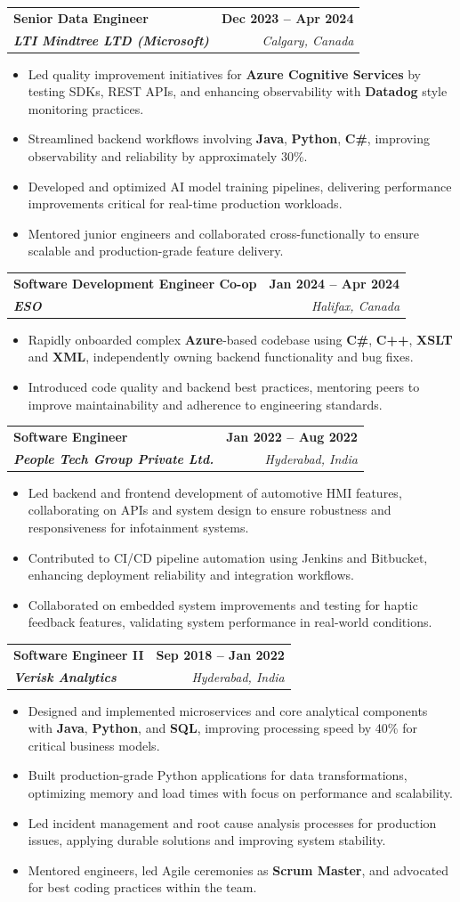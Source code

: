 \documentclass[letterpaper,11pt]{article}
\makeatletter
\newcommand{\resumeItem}[1]{
  \item\small{
    {#1 \vspace{-2pt}}
  }
}
\newcommand{\resumeSubheading}[4]{
  \vspace{-2pt}\item
    \begin{tabular*}{1.0\textwidth}[t]{l@{\extracolsep{\fill}}r}
      \textbf{#1} & \textbf{\small #2} \\
      \textit{\small#3} & \textit{\small #4} \\
    \end{tabular*}\vspace{-7pt}
}
\newcommand{\resumeItemListStart}{\begin{itemize}}
\newcommand{\resumeItemListEnd}{\end{itemize}\vspace{-5pt}}
\makeatother
\begin{document}
    \resumeSubheading
      {\textbf{Senior Data Engineer}}{\textbf{Dec 2023 -- Apr 2024}}
      {\textbf{LTI Mindtree LTD (Microsoft)}}{Calgary, Canada}
      \resumeItemListStart
        \resumeItem{Led quality improvement initiatives for \textbf{Azure Cognitive Services} by testing SDKs, REST APIs, and enhancing observability with \textbf{Datadog} style monitoring practices.}
        \resumeItem{Streamlined backend workflows involving \textbf{Java}, \textbf{Python}, \textbf{C\#}, improving observability and reliability by approximately 30\%.}
        \resumeItem{Developed and optimized AI model training pipelines, delivering performance improvements critical for real-time production workloads.}
        \resumeItem{Mentored junior engineers and collaborated cross-functionally to ensure scalable and production-grade feature delivery.}
      \resumeItemListEnd
    
    \resumeSubheading
      {\textbf{Software Development Engineer Co-op}}{\textbf{Jan 2024 -- Apr 2024}}
      {\textbf{ESO}}{Halifax, Canada}
      \resumeItemListStart
        \resumeItem{Rapidly onboarded complex \textbf{Azure}-based codebase using \textbf{C\#}, \textbf{C++}, \textbf{XSLT} and \textbf{XML}, independently owning backend functionality and bug fixes.}
        \resumeItem{Introduced code quality and backend best practices, mentoring peers to improve maintainability and adherence to engineering standards.}
      \resumeItemListEnd

    \resumeSubheading
      {\textbf{Software Engineer}}{\textbf{Jan 2022 -- Aug 2022}}
      {\textbf{People Tech Group Private Ltd.}}{Hyderabad, India}
      \resumeItemListStart
        \resumeItem{Led backend and frontend development of automotive HMI features, collaborating on APIs and system design to ensure robustness and responsiveness for infotainment systems.}
        \resumeItem{Contributed to CI/CD pipeline automation using Jenkins and Bitbucket, enhancing deployment reliability and integration workflows.}
        \resumeItem{Collaborated on embedded system improvements and testing for haptic feedback features, validating system performance in real-world conditions.}
      \resumeItemListEnd

    \resumeSubheading
      {\textbf{Software Engineer II}}{\textbf{Sep 2018 -- Jan 2022}}
      {\textbf{Verisk Analytics}}{Hyderabad, India}
      \resumeItemListStart
        \resumeItem{Designed and implemented microservices and core analytical components with \textbf{Java}, \textbf{Python}, and \textbf{SQL}, improving processing speed by 40\% for critical business models.}
        \resumeItem{Built production-grade Python applications for data transformations, optimizing memory and load times with focus on performance and scalability.}
        \resumeItem{Led incident management and root cause analysis processes for production issues, applying durable solutions and improving system stability.}
        \resumeItem{Mentored engineers, led Agile ceremonies as \textbf{Scrum Master}, and advocated for best coding practices within the team.}
      \resumeItemListEnd
\end{document}
